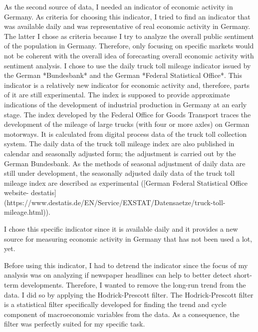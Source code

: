 \documentclass[11pt, a4paper, leqno]{article}
\begin{document}
As the second source of data, I needed an indicator of economic activity in Germany. As criteria for choosing this indicator, I tried to find an indicator that was available daily and was representative of real economic activity in Germany. The latter I chose as criteria because I try to analyze the overall public sentiment of the population in Germany. Therefore, only focusing on specific markets would not be coherent with the overall idea of forecasting overall economic activity with sentiment analysis.
I chose to use the daily truck toll mileage indicator issued by the German *Bundesbank* and the German *Federal Statistical Office*. This indicator is a relatively new indicator for economic activity and, therefore, parts of it are still experimental. The index is supposed to provide approximate indications of the development of industrial production in Germany at an early stage. The index developed by the Federal Office for Goods Transport traces the development of the mileage of large trucks (with four or more axles) on German motorways. It is calculated from digital process data of the truck toll collection system. The daily data of the truck toll mileage index are also published in calendar and seasonally adjusted form; the adjustment is carried out by the German Bundesbank. As the methods of seasonal adjustment of daily data are still under development, the seasonally adjusted daily data of the truck toll mileage index are described as experimental ([German Federal Statistical Office website- destatis](https://www.destatis.de/EN/Service/EXSTAT/Datensaetze/truck-toll-mileage.html)).

I chose this specific indicator since it is available daily and it provides a new source for measuring economic activity in Germany that has not been used a lot, yet.

Before using this indicator, I had to detrend the indicator since the focus of my analysis was on analyzing if newspaper headlines can help to better detect short-term developments. Therefore, I wanted to remove the long-run trend from the data. I did so by applying the Hodrick-Prescott filter. The Hodrick-Prescott filter is a statistical filter specifically developed for finding the trend and cycle component of macroeconomic variables from the data. As a consequence, the filter was perfectly suited for my specific task. 
\end{document}
